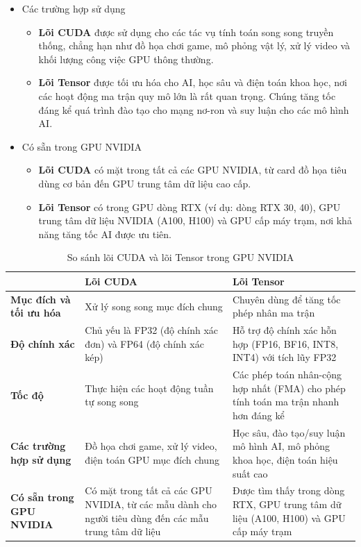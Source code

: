 \documentclass[a4paper]{article}
\begin{document}
\begin{itemize}
\begin{itemize}
    \end{itemize}
    \item Các trường hợp sử dụng\par
    \begin{itemize}
        \item \textbf{Lõi CUDA} được sử dụng cho các tác vụ tính toán song song truyền thống, chẳng hạn như đồ họa chơi game, mô phỏng vật lý, xử lý video và khối lượng công việc GPU thông thường.
        \item \textbf{Lõi Tensor} được tối ưu hóa cho AI, học sâu và điện toán khoa học, nơi các hoạt động ma trận quy mô lớn là rất quan trọng. Chúng tăng tốc đáng kể quá trình đào tạo cho mạng nơ-ron và suy luận cho các mô hình AI.
    \end{itemize}
    \item Có sẵn trong GPU NVIDIA\par
    \begin{itemize}
        \item \textbf{Lõi CUDA} có mặt trong tất cả các GPU NVIDIA, từ card đồ họa tiêu dùng cơ bản đến GPU trung tâm dữ liệu cao cấp.
        \item \textbf{Lõi Tensor} có trong GPU dòng RTX (ví dụ: dòng RTX 30, 40), GPU trung tâm dữ liệu NVIDIA (A100, H100) và GPU cấp máy trạm, nơi khả năng tăng tốc AI được ưu tiên. 
    \end{itemize}
\end{itemize}
\begin{table}[h]
    \centering
    \renewcommand{\arraystretch}{1.3} %
    \begin{tabular}{|p{5cm}|p{5cm}|p{5cm}|}
        \hline
        \textbf{} & \textbf{Lõi CUDA} & \textbf{Lõi Tensor} \\
        \hline
        \textbf{Mục đích và tối ưu hóa} & Xử lý song song mục đích chung & Chuyên dùng để tăng tốc phép nhân ma trận \\
        \hline
        \textbf{Độ chính xác} & Chủ yếu là FP32 (độ chính xác đơn) và FP64 (độ chính xác kép) & Hỗ trợ độ chính xác hỗn hợp (FP16, BF16, INT8, INT4) với tích lũy FP32 \\
        \hline
        \textbf{Tốc độ} & Thực hiện các hoạt động tuần tự song song & Các phép toán nhân-cộng hợp nhất (FMA) cho phép tính toán ma trận nhanh hơn đáng kể \\
        \hline
        \textbf{Các trường hợp sử dụng} & Đồ họa chơi game, xử lý video, điện toán GPU mục đích chung & Học sâu, đào tạo/suy luận mô hình AI, mô phỏng khoa học, điện toán hiệu suất cao \\
        \hline
        \textbf{Có sẵn trong GPU NVIDIA} & Có mặt trong tất cả các GPU NVIDIA, từ các mẫu dành cho người tiêu dùng đến các mẫu trung tâm dữ liệu & Được tìm thấy trong dòng RTX, GPU trung tâm dữ liệu (A100, H100) và GPU cấp máy trạm \\
        \hline
    \end{tabular}
    \caption{So sánh lõi CUDA và lõi Tensor trong GPU NVIDIA}
    \label{tab:cuda_tensor_comparison}
\end{table}
\end{document}
